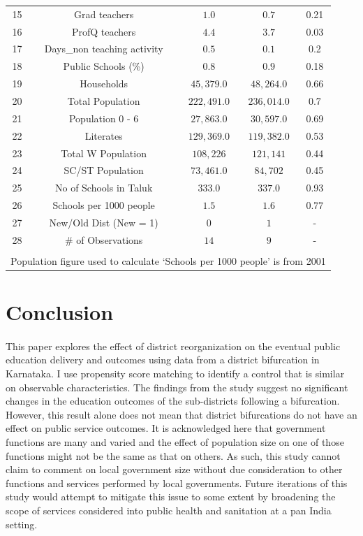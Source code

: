 \documentclass[12pt, a4paper]{article}
\begin{document}
\begin{table}[!htbp]
\begin{tabular}{@{\extracolsep{5pt}} ccccc}
		15 & Grad teachers & $1.0$ & $0.7$ & 0.21 \\ 
		16 & ProfQ teachers & $4.4$ & $3.7$ & 0.03 \\ 
		17 & Days\_non teaching activity & $0.5$ & $0.1$ & 0.2 \\ 
		18 & Public Schools (\%) & $0.8$ & $0.9$ & 0.18 \\ 
		19 & Households & $45,379.0$ & $48,264.0$ & 0.66 \\ 
		20 & Total Population & $222,491.0$ & $236,014.0$ & 0.7 \\ 
		21 & Population 0 - 6 & $27,863.0$ & $30,597.0$ & 0.69 \\ 
		22 & Literates & $129,369.0$ & $119,382.0$ & 0.53 \\ 
		23 & Total W Population & $108,226$ & $121,141$ & 0.44 \\ 
		24 & SC/ST Population & $73,461.0$ & $84,702$ & 0.45 \\ 
		25 & No of Schools in Taluk & $333.0$ & $337.0$ & 0.93 \\ 
		26 & Schools per 1000 people & $1.5$ & $1.6$ & 0.77 \\ 
		27 & New/Old Dist (New = 1) & $0$ & $1$ & - \\ 
		28 & \# of Observations & $14$ & $9$ & - \\ 
		\hline \\[-1.8ex] 
		\multicolumn{5}{l}{Population figure used to calculate `Schools per 1000 people' is from 2001} \\ 
	\end{tabular} 
\end{table}

\section*{Conclusion}
\paragraph{} This paper explores the effect of district reorganization on the eventual public education delivery and outcomes using data from a district bifurcation in Karnataka. I use propensity score matching to identify a control that is similar on observable characteristics. The findings from the study suggest no significant changes in the education outcomes of the sub-districts following a bifurcation. However, this result alone does not mean that district bifurcations do not have an effect on public service outcomes. It is acknowledged here that government functions are many and varied and the effect of population size on one of those functions might not be the same as that on others. As such, this study cannot claim to comment on local government size without due consideration to other functions and services performed by local governments. Future iterations of this study would attempt to mitigate this issue to some extent by broadening the scope of services considered into public health and sanitation at a pan India setting.
\end{document}
